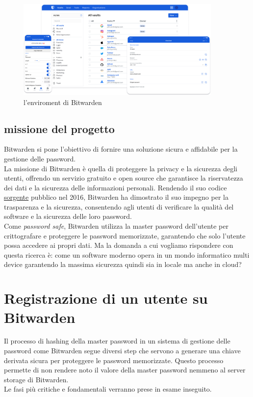 \documentclass[a4paper,12pt]{report}
\begin{document}
		\begin{figure}[H]
			\centering
			\includegraphics[width=0.9\textwidth]{wardenEnviroment.png}
			\caption{l'enviroment di Bitwarden}
			\label{fig:eviroment}
		\end{figure}

		\section{missione del progetto}
		Bitwarden si pone l'obiettivo di fornire
		una soluzione sicura e affidabile per la gestione delle password.\\ La
		missione di Bitwarden è quella di proteggere la privacy e la sicurezza
		degli utenti, offrendo un servizio gratuito e open source che garantisce
		la riservatezza dei dati e la sicurezza delle informazioni personali.
		Rendendo il suo codice \href{https://github.com/bitwarden}{sorgente}
		pubblico nel 2016, Bitwarden ha dimostrato il suo impegno per la
		trasparenza e la sicurezza, consentendo agli utenti di verificare la
		qualità del software e la sicurezza delle loro password.\\
		
		Come \textit{password safe}, Bitwarden utilizza la master password
		dell'utente per crittografare e proteggere le password memorizzate,
		garantendo che solo l'utente possa accedere ai propri dati. Ma la domanda
		a cui vogliamo rispondere con questa ricerca è: come un software moderno
		opera in un mondo informatico multi device garantendo la massima sicurezza
		quindi sia in locale ma anche in cloud?
	\chapter{Registrazione di un utente su Bitwarden}

		Il processo di hashing della master password in un sistema di gestione
		delle password come Bitwarden segue diversi step che servono a generare 
		una chiave derivata sicura per proteggere le password memorizzate. Questo
		processo permette di non rendere noto il valore della master password
		nemmeno al server storage di Bitwarden.\cite{login-encryption}\\
		Le fasi più critiche e fondamentali verranno prese in esame inseguito.
\end{document}

